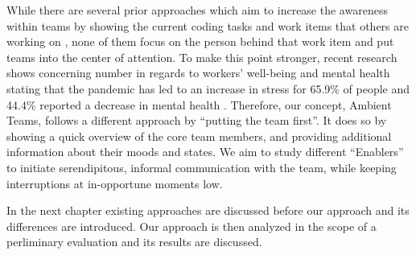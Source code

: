 While there are several prior approaches which aim to increase the awareness within teams by showing the current coding tasks and work items that others are working on \autocite{biehl2007fastdash, jakobsen2009wipdash}, none of them focus on the person behind that work item and put teams into the center of attention. To make this point stronger, recent research shows concerning number in regards to workers' well-being and mental health stating that the pandemic has led to an increase in stress for 65.9\% of people and 44.4\% reported a decrease in mental health \autocite{qualtricksmental}. Therefore, our concept, Ambient Teams, follows a different approach by ``putting the team first''. It does so by showing a quick overview of the core team members, and providing additional information about their moods and states. We aim to study different ``Enablers'' to initiate  serendipitous, informal communication with the team, while keeping interruptions at in-opportune moments low.

In the next chapter existing approaches are discussed before our approach and its differences are introduced. Our approach is then analyzed in the scope of a perliminary evaluation and its results are discussed.


